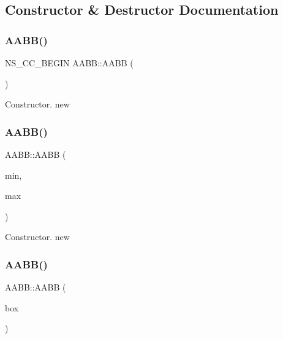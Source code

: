 \subsection{Constructor \& Destructor Documentation}
\mbox{\label{classAABB_a948c874a4c6bc1ef7b84eef5e806f9e3}} 
\subsubsection{\texorpdfstring{A\+A\+B\+B()}{AABB()}\hspace{0.1cm}{\footnotesize\ttfamily [1/5]}}
{\footnotesize\ttfamily N\+S\+\_\+\+C\+C\+\_\+\+B\+E\+G\+IN A\+A\+B\+B\+::\+A\+A\+BB (\begin{DoxyParamCaption}{ }\end{DoxyParamCaption})}

Constructor.  new \mbox{\label{classAABB_a752c7688271964a668be954aaadb7faa}} 
\subsubsection{\texorpdfstring{A\+A\+B\+B()}{AABB()}\hspace{0.1cm}{\footnotesize\ttfamily [2/5]}}
{\footnotesize\ttfamily A\+A\+B\+B\+::\+A\+A\+BB (\begin{DoxyParamCaption}\item[{const \hyperlink{classVec3}{Vec3} \&}]{min,  }\item[{const \hyperlink{classVec3}{Vec3} \&}]{max }\end{DoxyParamCaption})}

Constructor.  new \mbox{\label{classAABB_a16fef3ef57ae606861e19171622e1c14}} 
\subsubsection{\texorpdfstring{A\+A\+B\+B()}{AABB()}\hspace{0.1cm}{\footnotesize\ttfamily [3/5]}}
{\footnotesize\ttfamily A\+A\+B\+B\+::\+A\+A\+BB (\begin{DoxyParamCaption}\item[{const \hyperlink{classAABB}{A\+A\+BB} \&}]{box }\end{DoxyParamCaption})}

